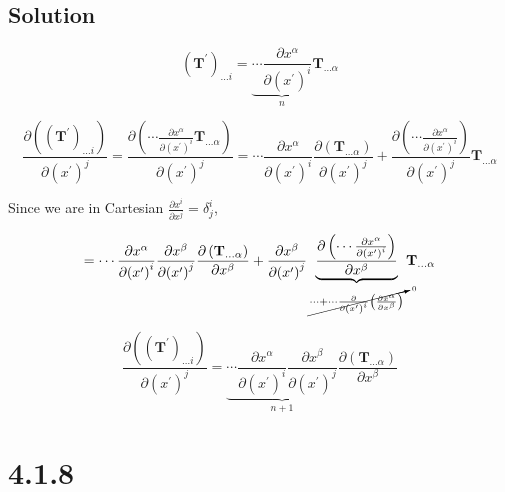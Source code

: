 \documentclass[12pt]{article}
\begin{document}
\subsection{Solution}

\[
    {\left(\textbf{T}^\prime\right)}_{\ldots i}
    = \underbrace{\cdots
        \frac{\partial x^\alpha}{\partial {\left(x^\prime\right)}^i}}_n
    \textbf{T}_{\ldots \alpha}
\]

\[
    \frac{\partial \left({\left(\textbf{T}^\prime\right)}_{\ldots i}\right)}{\partial {\left(x^\prime\right)}^j}
    = \frac{\partial \left(
        \cdots
        \frac{\partial x^\alpha}{\partial {\left(x^\prime\right)}^i}
        \textbf{T}_{\ldots \alpha}
        \right)}{\partial {\left(x^\prime\right)}^j}
    = \cdots
    \frac{\partial x^\alpha}{\partial {\left(x^\prime\right)}^i}
    \frac{\partial \left(
        \textbf{T}_{\ldots \alpha}
        \right)}{\partial {\left(x^\prime\right)}^j}
    + \frac{\partial \left(
        \cdots
        \frac{\partial x^\alpha}{\partial {\left(x^\prime\right)}^i}
        \right)}{\partial {\left(x^\prime\right)}^j}
    \textbf{T}_{\ldots \alpha}
\]

Since we are in Cartesian \(\frac{\partial x^i}{\partial x^j} = \delta^i_j\),

\[
    = \cdots
    \frac{\partial x^\alpha}{\partial {\left(x^\prime\right)}^i}
    \frac{\partial x^\beta}{\partial {\left(x^\prime\right)}^j}
    \frac{\partial \left(
        \textbf{T}_{\ldots \alpha}
        \right)}{\partial x^\beta}
    +
    \frac{\partial x^\beta}{\partial {\left(x^\prime\right)}^j}
    \underbrace{\frac{\partial \left(
            \cdots
            \frac{\partial x^\alpha}{\partial {\left(x^\prime\right)}^i}
            \right)}{\partial x^\beta}
    }_{
        \cancelto{0}{\cdots + \cdots
            \frac{\partial}{\partial {\left(x^\prime\right)}^i}
            \left(\frac{\partial x^\alpha}{\partial x^\beta}\right)}
    }
    \textbf{T}_{\ldots \alpha}
\]

\[
    \frac{\partial \left({\left(\textbf{T}^\prime\right)}_{\ldots i}\right)}{\partial {\left(x^\prime\right)}^j}
    = \underbrace{
        \cdots
        \frac{\partial x^\alpha}{\partial {\left(x^\prime\right)}^i}
        \frac{\partial x^\beta}{\partial {\left(x^\prime\right)}^j}}_{n + 1}
    \frac{\partial \left(
        \textbf{T}_{\ldots \alpha}
        \right)}{\partial x^\beta}
\]

\newpage
\section{4.1.8}
\end{document}
